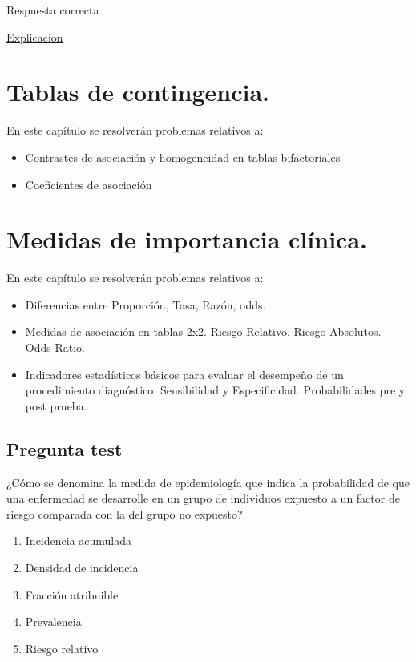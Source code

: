 \documentclass[
]{book}
\providecommand{\tightlist}{%
  \setlength{\itemsep}{0pt}\setlength{\parskip}{0pt}}
\begin{document}
Respuesta correcta

\href{https://1fjmanzano.github.io/bioestadistica/relaci\%C3\%B3n-entre-variables-nume\%CC\%81ricas.html\#coeficiente-de-correlacio\%CC\%81n}{Explicacion}

\hypertarget{tablas-de-contingencia.}{%
\chapter{Tablas de contingencia.}\label{tablas-de-contingencia.}}

En este capítulo se resolverán problemas relativos a:

\begin{itemize}
\tightlist
\item
  Contrastes de asociación y homogeneidad en tablas bifactoriales
\item
  Coeficientes de asociación
\end{itemize}

\hypertarget{medidas-de-importancia-cluxednica.}{%
\chapter{Medidas de importancia clínica.}\label{medidas-de-importancia-cluxednica.}}

En este capítulo se resolverán problemas relativos a:

\begin{itemize}
\tightlist
\item
  Diferencias entre Proporción, Tasa, Razón, odds.
\item
  Medidas de asociación en tablas 2x2. Riesgo Relativo. Riesgo Absolutos. Odds-Ratio.
\item
  Indicadores estadísticos básicos para evaluar el desempeño de un procedimiento diagnóstico: Sensibilidad y Especificidad. Probabilidades pre y post prueba.
\end{itemize}

\hypertarget{pregunta-test-150}{%
\section{Pregunta test}\label{pregunta-test-150}}

¿Cómo se denomina la medida de epidemiología que indica la probabilidad de que una enfermedad se desarrolle en un grupo de individuos expuesto a un factor de riesgo comparada con la del grupo no expuesto?

\begin{enumerate}
\def\labelenumi{\alph{enumi})}
\tightlist
\item
  Incidencia acumulada
\item
  Densidad de incidencia
\item
  Fracción atribuible
\item
  Prevalencia
\item
  Riesgo relativo
\end{enumerate}
\end{document}
